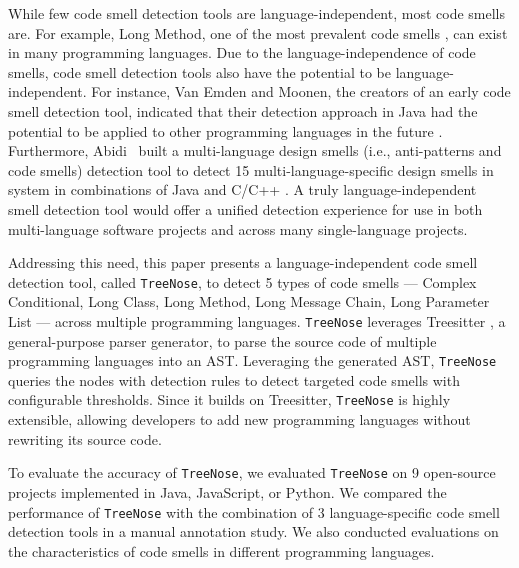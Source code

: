 While few code smell detection tools are language-independent, most code smells
are. For example, Long Method, one of the most prevalent code smells
\cite{developersCare}, can exist in many programming languages. Due to the
language-independence of code smells, code smell detection tools also have the
potential to be language-independent. For instance, Van Emden and Moonen, the
creators of an early code smell detection tool, indicated that their detection
approach in Java had the potential to be applied to other programming languages
in the future \cite{1173068}. Furthermore, Abidi~\etal{} built a multi-language
design smells (i.e., anti-patterns and code smells) detection tool to detect 15
multi-language-specific design smells in system in combinations of Java and
C/C++ \cite{MultiLanguageCodeSmells,Fault-Prone}. A truly language-independent
smell detection tool would offer a unified detection experience for use in both
multi-language software projects and across many single-language projects.




Addressing this need, this paper presents a language-independent code smell
detection tool, called \texttt{TreeNose}, to detect 5 types of code smells ---
Complex Conditional, Long Class, Long Method, Long Message Chain, Long Parameter
List --- across multiple programming languages. \texttt{TreeNose} leverages
Treesitter \cite{treeSitter}, a general-purpose parser generator, to parse the
source code of multiple programming languages into an AST. Leveraging the
generated AST, \texttt{TreeNose} queries the nodes with detection rules to
detect targeted code smells with configurable thresholds. Since it builds on
Treesitter, \texttt{TreeNose} is highly extensible, allowing developers to add
new programming languages without rewriting its source code.


To evaluate the accuracy of \texttt{TreeNose}, we evaluated \texttt{TreeNose} on
9 open-source projects implemented in Java, JavaScript, or Python. We compared
the performance of \texttt{TreeNose} with the combination of 3 language-specific
code smell detection tools in a manual annotation study. We also conducted
evaluations on the characteristics of code smells in different programming
languages.

